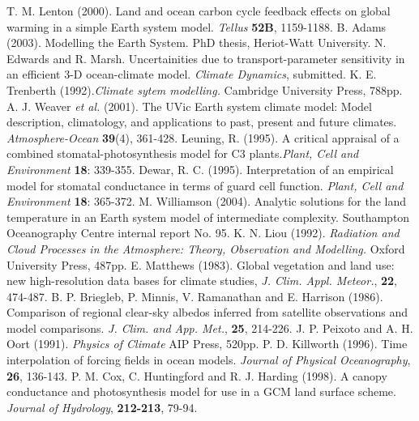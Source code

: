 \documentclass[10pt,a4paper]{report}
\begin{document}
\begin{thebibliography}{10}
 T. M. Lenton (2000). Land and ocean carbon cycle
feedback effects on global warming in a simple Earth system model.
{\em Tellus} {\bf 52B}, 1159-1188.
 B. Adams (2003). Modelling the Earth System. PhD
thesis, Heriot-Watt University.
 N. Edwards and R. Marsh.
Uncertainities due to transport-parameter sensitivity in an
efficient 3-D ocean-climate model. {\em Climate Dynamics},
submitted.
 K. E. Trenberth (1992).{\em Climate sytem
modelling.} Cambridge University Press, 788pp.
 A. J. Weaver {\it et al.} (2001). The UVic Earth
system climate model: Model description, climatology, and
applications to past, present and future climates. {\em
Atmosphere-Ocean} {\bf 39}(4), 361-428.
 Leuning, R. (1995). A critical appraisal of a
combined stomatal-photosynthesis model for C3 plants.{\em Plant,
Cell and Environment} {\bf 18}: 339-355.
 Dewar, R. C. (1995). Interpretation of an empirical
model for stomatal conductance in terms of guard cell function.
{\em  Plant, Cell and Environment} {\bf 18}: 365-372.
 M. Williamson (2004). Analytic
solutions for the land temperature in an Earth system model of
intermediate complexity. Southampton Oceanography Centre internal
report No. 95.
 K. N. Liou (1992). {\em Radiation and Cloud
Processes in the Atmosphere: Theory, Observation and Modelling.}
Oxford University Press, 487pp.
  E. Matthews (1983). Global vegetation and land use:  new
high-resolution data bases for climate studies, {\em J. Clim.
Appl. Meteor.}, {\bf 22}, 474-487.
 B. P. Briegleb, P. Minnis, V. Ramanathan and
E. Harrison (1986). Comparison of regional clear-sky albedos
inferred from satellite observations and model comparisons. {\em
J. Clim. and App. Met.}, {\bf 25}, 214-226.
 J. P. Peixoto and A. H. Oort (1991). {\em Physics of
Climate} AIP Press, 520pp.
 P. D. Killworth (1996). Time interpolation of
forcing fields in ocean models. {\em Journal of Physical
Oceanography}, {\bf 26}, 136-143.
 P. M. Cox, C. Huntingford and R. J. Harding (1998).
A canopy conductance and photosynthesis model for use in a GCM
land surface scheme. {\em Journal of Hydrology}, {\bf 212-213},
79-94.
\end{thebibliography}
\end{document}
